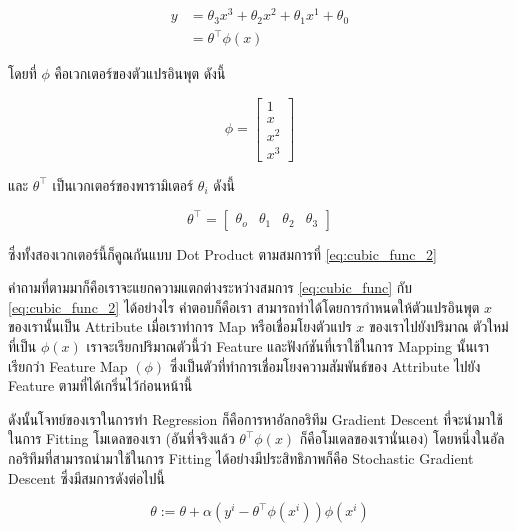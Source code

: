 \begin{align}\label{eq:cubic_func_2}
    y & = \theta_{3}x^{3} + \theta_{2}x^{2} + \theta_{1}x^{1} + \theta_{0} \nonumber \\
      & = \theta^{\top}\phi(x)
\end{align}

\noindent โดยที่ $\phi$ คือเวกเตอร์ของตัวแปรอินพุต ดังนี้

\begin{equation}
    \phi =
    \begin{bmatrix}
        1     \\
        x     \\
        x^{2} \\
        x^{3}
    \end{bmatrix}
\end{equation}

\noindent และ $\theta^{\top}$ เป็นเวกเตอร์ของพารามิเตอร์ $\theta_{i}$ ดังนี้

\begin{equation}
    \theta^{\top} =
    \begin{bmatrix}
        \theta_{o} & \theta_{1} & \theta_{2} & \theta_{3}
    \end{bmatrix}
\end{equation}

\noindent ซึ่งทั้งสองเวกเตอร์นี้ก็คูณกันแบบ Dot Product ตามสมการที่ \eqref{eq:cubic_func_2}

คำถามที่ตามมาก็คือเราจะแยกความแตกต่างระหว่างสมการ \eqref{eq:cubic_func} กับ \eqref{eq:cubic_func_2} ได้อย่างไร คำตอบก็คือเรา%
สามารถทำได้โดยการกำหนดให้ตัวแปรอินพุต $x$ ของเรานั้นเป็น Attribute เมื่อเราทำการ Map หรือเชื่อมโยงตัวแปร $x$ ของเราไปยังปริมาณ%
ตัวใหม่ที่เป็น $\phi(x)$ เราจะเรียกปริมาณตัวนี้ว่า Feature และฟังก์ชันที่เราใช้ในการ Mapping นั้นเราเรียกว่า Feature Map $(\phi)$
ซึ่งเป็นตัวที่ทำการเชื่อมโยงความสัมพันธ์ของ Attribute ไปยัง Feature ตามที่ได้เกริ่นไว้ก่อนหน้านี้

ดังนั้นโจทย์ของเราในการทำ Regression ก็คือการหาอัลกอริทึม Gradient Descent ที่จะนำมาใช้ในการ Fitting โมเดลของเรา (อันที่จริงแล้ว
$\theta^{\top}\phi(x)$ ก็คือโมเดลของเรานั่นเอง) โดยหนึ่งในอัลกอริทึมที่สามารถนำมาใช้ในการ Fitting ได้อย่างมีประสิทธิภาพก็คือ
Stochastic Gradient Descent ซึ่งมีสมการดังต่อไปนี้

\begin{equation}\label{eq:sto_grad_des}
    \theta := \theta + \alpha (y^{i} - \theta^{\top}\phi(x^{i}))\phi(x^{i})
\end{equation}


